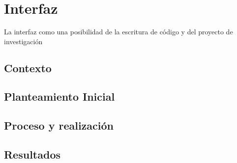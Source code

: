  \section{Interfaz}

La interfaz como una posibilidad de la escritura de código y del proyecto de investigación 
 
\subsection{Contexto}
\subsection{Planteamiento Inicial}
\subsection{Proceso y realización}
\subsection{Resultados}
